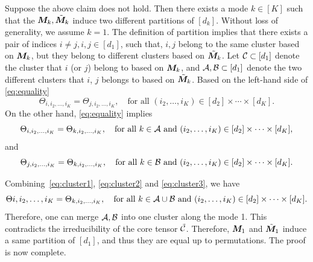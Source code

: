 \documentclass{article}
\begin{document}
\begin{appendices}
Suppose the above claim does not hold. Then there exists a mode $k\in[K]$ such that the $\bm M_k, \tilde {\bm M}_k$ induce two different partitions of $[d_k]$. Without loss of generality, we assume $k=1$. The definition of partition implies that there exists a pair of indices $i\neq j, i,j\in[d_1]$, such that, $i,j$ belong to the same cluster based on $\bm M_k$, but they belong to different clusters based on $\tilde {\bm M}_k$. Let $\mathcal{C}\subset [d_1] $ denote the cluster that $i$ (or $j$) belong to based on $\bm M_k$, and $\mathcal{A}, \mathcal{B}\subset[d_1]$ denote the two different clusters that $i$, $j$ belongs to based on $\tilde {\bm M}_k$. Based on the left-hand side of \eqref{eq:equality}
\begin{equation}\label{eq:cluster1}
\Theta_{i,i_2,\ldots,i_K}=\Theta_{j,i_2,\ldots,i_K},\quad \text{for all } (i_2,\ldots,i_K)\in[d_2]\times\cdots\times [d_K].
\end{equation}
 On the other hand, \eqref{eq:equality} implies
\begin{equation}\label{eq:cluster2}
\Theta_{i,i_2,\ldots,i_K}=\Theta_{k,i_2,\ldots,i_K},\quad \text{for all } k\in \mathcal{A} \text{ and }(i_2,\ldots,i_K)\in[d_2]\times\cdots\times [d_K],
\end{equation}
and
\begin{equation}\label{eq:cluster3}
\Theta_{j,i_2,\ldots,i_K}=\Theta_{k,i_2,\ldots,i_K},\quad \text{for all } k\in \mathcal{B} \text{ and }(i_2,\ldots,i_K)\in[d_2]\times\cdots\times [d_K].
\end{equation}

Combining~\eqref{eq:cluster1}, \eqref{eq:cluster2} and \eqref{eq:cluster3}, we have
\[
\Theta{i,i_2,\ldots,i_K}=\Theta_{k,i_2,\ldots,i_K},\quad \text{for all } k\in \mathcal{A}\cup \mathcal{B} \text{ and }(i_2,\ldots,i_K)\in[d_2]\times\cdots\times [d_K].
\]
Therefore, one can merge $\mathcal{A}, \mathcal{B}$ into one cluster along the mode 1. This contradicts the irreducibility of the core tensor $\tilde {\mathcal{C}}$. Therefore, $\bm M_1$ and $\tilde {\bm M}_1$ induce a same partition of $[d_1]$, and thus they are equal up to permutations. The proof is now complete. 





\end{appendices}
\end{document}
